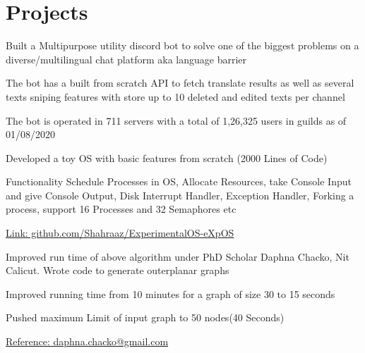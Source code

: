 \documentclass[]{deedy-resume-openfont}
\begin{document}
\begin{minipage}[t]{0.66\textwidth}
\section{Projects}

\begin{tightemize}
\item Built a Multipurpose utility discord bot to solve one of the biggest problems on a diverse/multilingual chat platform aka language barrier
\item The bot has a built from scratch API to fetch translate results as well as several texts sniping features with store up to 10 deleted and edited texts per channel
\item The bot is operated in 711 servers with a total of 1,26,325 users in guilds
as of 01/08/2020
\end{tightemize}
\sectionsep


\begin{tightemize}
\item Developed a toy OS with basic features from scratch (2000 Lines of Code)
\item Functionality Schedule Processes in OS, Allocate Resources, take Console Input and give Console Output, Disk Interrupt Handler, Exception Handler, Forking a process, support 16 Processes and 32 Semaphores etc
\item \href{https://github.com/Shahraaz/ExperimentalOS-eXpOS}{Link: github.com/Shahraaz/ExperimentalOS-eXpOS }
\end{tightemize}
\sectionsep

\begin{tightemize}
\item Improved run time of above algorithm under PhD Scholar
Daphna Chacko, Nit Calicut. Wrote code to generate outerplanar graphs
\item Improved running time from 10 minutes for a graph of size 30 to 15
seconds
\item Pushed maximum Limit of input graph to 50 nodes(40 Seconds)
\item \href{mailto:daphna.chacko@gmail.com}{Reference: daphna.chacko@gmail.com}
\end{tightemize}
\sectionsep


\end{minipage}
\end{document}
